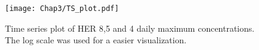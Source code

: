 \begin{figure}[ht]
    \centering
    \texttt{[image: Chap3/TS\_plot.pdf]}
    \caption{Time series plot of HER 8,5 and 4 daily maximum concentrations. The log scale was used for a easier visualization.}
    \label{fig:tsplot_ex}
\end{figure}





 
 




